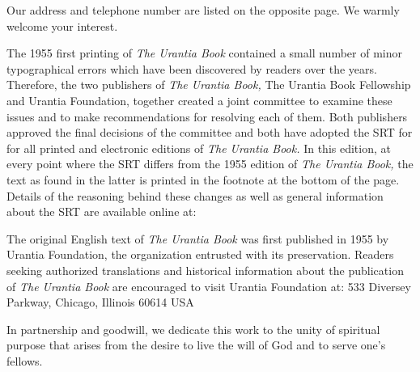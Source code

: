 Our address and telephone number are listed on the opposite page.
We warmly welcome your interest.


The 1955 first printing of \emph{The Urantia Book} contained a small number of minor typographical errors which have been discovered by readers over the years.
Therefore, the two publishers of \emph{The Urantia Book,} The Urantia Book Fellowship and Urantia Foundation, together created a joint committee to examine these issues and to make recommendations for resolving each of them.
Both publishers approved the final decisions of the committee and both have adopted the SRT for for all printed and electronic editions of \emph{The Urantia Book.}
In this edition, at every point where the SRT differs from the 1955 edition of \emph{The Urantia Book,} the text as found in the latter is printed in the footnote at the bottom of the page.
Details of the reasoning behind these changes as well as general information about the SRT are available online at: 




The original English text of \emph{The Urantia Book} was first published in 1955 by Urantia Foundation, the organization entrusted with its preservation.
Readers seeking authorized translations and historical information about the publication of \emph{The Urantia Book} are encouraged to visit Urantia Foundation at:  533 Diversey Parkway, Chicago, Illinois 60614 USA

In partnership and goodwill, we dedicate this work to the unity of spiritual purpose that arises from the desire to live the will of God and to serve one's fellows.

